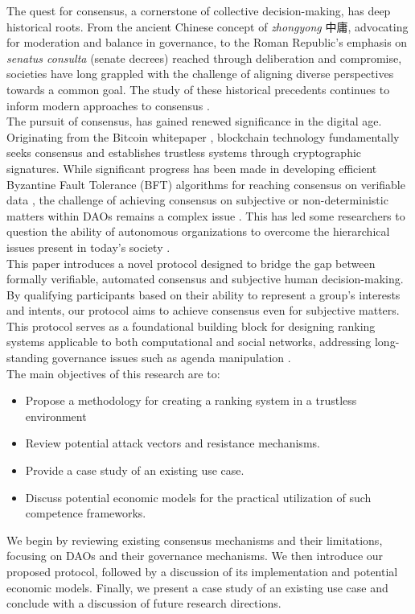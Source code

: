 \documentclass{article}
\begin{document}
\begin{CJK}{UTF8}{gbsn}
\begin{multicols}{2}
        The quest for consensus, a cornerstone of collective decision-making, has deep historical roots. From the ancient Chinese concept of \textit{zhongyong} {
            中庸}, advocating for moderation and balance in governance, to the Roman Republic's emphasis on \textit{senatus consulta} (senate decrees) reached through deliberation and compromise, societies have long grappled with the challenge of aligning diverse perspectives towards a common goal. The study of these historical precedents continues to inform modern approaches to consensus \cite{Andersen2019} \cite{Frederic2014}. \\
        The pursuit of consensus, has gained renewed significance in the digital age. Originating from the Bitcoin whitepaper \cite{Satoshi}, blockchain technology fundamentally seeks consensus and establishes trustless systems through cryptographic signatures. While significant progress has been made in developing efficient Byzantine Fault Tolerance (BFT) algorithms for reaching consensus on verifiable data \cite{Genrui2023}, the challenge of achieving consensus on subjective or non-deterministic matters within DAOs \cite{Hassan2021} remains a complex issue \cite{Shuai2019}\cite{Rainer2023}. This has led some researchers to question the ability of autonomous organizations to overcome the hierarchical issues present in today's society \cite{Marcella2016}\cite{Xuan2024}.   \\
        This paper introduces a novel protocol designed to bridge the gap between formally verifiable, automated consensus and subjective human decision-making. By qualifying participants based on their ability to represent a group's interests and intents, our protocol aims to achieve consensus even for subjective matters. This protocol serves as a foundational building block for designing ranking systems applicable to both computational and social networks, addressing long-standing governance issues such as agenda manipulation  \cite{McKelvey1976}.\\
        The main objectives of this research are to:

        \begin{itemize}[nosep]
            \item Propose a methodology for creating a ranking system in a trustless environment
            \item Review potential attack vectors and resistance mechanisms.
            \item Provide a case study of an existing use case.
            \item Discuss potential economic models for the practical utilization of such competence frameworks.
        \end{itemize}
        We begin by reviewing existing consensus mechanisms and their limitations, focusing on DAOs and their governance mechanisms. We then introduce our proposed protocol, followed by a discussion of its implementation and potential economic models. Finally, we present a case study of an existing use case and conclude with a discussion of future research directions.


\end{multicols}
\end{CJK}
\end{document}
